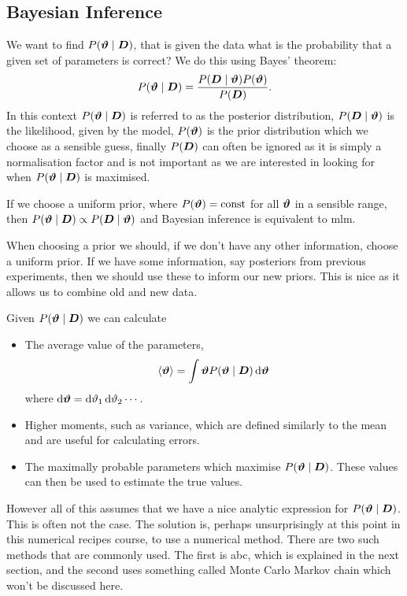 \documentclass[a4paper]{article}
\newcommand{\st}{\mid}
\begin{document}
    \subsection{Bayesian Inference}
    We want to find \(P(\vv{\vartheta}\st \vv{D})\), that is given the data what is the probability that a given set of parameters is correct?
    We do this using Bayes' theorem:
    \[P(\vv{\vartheta}\st\vv{D}) = \frac{P(\vv{D}\st\vv{\vartheta}) P(\vv{\vartheta})}{P(\vv{D})}.\]
    In this context \(P(\vv{\vartheta}\st\vv{D})\) is referred to as the posterior distribution, \(P(\vv{D}\st\vv{\vartheta})\) is the likelihood, given by the model, \(P(\bm{\vartheta})\) is the prior distribution which we choose as a sensible guess, finally \(P(\bm{D})\) can often be ignored as it is simply a normalisation factor and is not important as we are interested in looking for when \(P(\vv{\vartheta}\st\vv{D})\) is maximised.
    
    If we choose a uniform prior, where \(P(\bm{\vartheta}) = \text{const}\) for all \(\bm{\vartheta}\) in a sensible range, then \(P(\vv{\vartheta}\st\vv{D})\propto P(\vv{D}\st\vv{\vartheta})\) and Bayesian inference is equivalent to \gls{mlm}.
    
    When choosing a prior we should, if we don't have any other information, choose a uniform prior.
    If we have some information, say posteriors from previous experiments, then we should use these to inform our new priors.
    This is nice as it allows us to combine old and new data.
    
    Given \(P(\vv{\vartheta}\st\vv{D})\) we can calculate
    \begin{itemize}
        \item The average value of the parameters,
        \[\expected{\vv{\vartheta}} = \int \vv{\vartheta}P(\vv{\vartheta}\st \vv{D})\dd{\vv{\vartheta}}\]
        where \(\dd{\bm{\vartheta}} = \dd{\vartheta_1}\dd{\vartheta_2}\dotsm\).
        \item Higher moments, such as variance, which are defined similarly to the mean and are useful for calculating errors.
        \item The maximally probable parameters which maximise \(P(\vv{\vartheta}\st\vv{D})\).
        These values can then be used to estimate the true values.
    \end{itemize}
    
    However all of this assumes that we have a nice analytic expression for \(P(\vv{\vartheta}\st\vv{D})\).
    This is often not the case.
    The solution is, perhaps unsurprisingly at this point in this numerical recipes course, to use a numerical method.
    There are two such methods that are commonly used.
    The first is \gls{abc}, which is explained in the next section, and the second uses something called Monte Carlo Markov chain which won't be discussed here.
    
\end{document}
